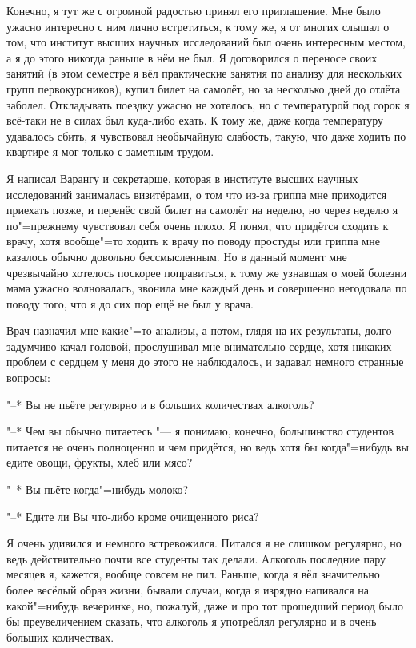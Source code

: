 Конечно, я тут же с огромной радостью принял его приглашение.
Мне было ужасно интересно с ним лично встретиться, к тому же, я от многих слышал
о том, что институт высших научных исследований был очень интересным местом, а
я до этого никогда раньше в нём не был.
Я договорился о переносе своих занятий (в этом семестре я вёл практические
занятия по анализу для нескольких групп первокурсников), купил билет на самолёт,
но за несколько дней до отлёта заболел.
Откладывать поездку ужасно не хотелось, но с температурой под сорок я всё-таки
не в силах был куда-либо ехать.
К тому же, даже когда температуру удавалось сбить, я чувствовал необычайную
слабость, такую, что даже ходить по квартире я мог только с заметным трудом.

Я написал Варангу и секретарше, которая в институте высших научных исследований
занималась визитёрами, о том что из-за гриппа мне приходится приехать позже, и
перенёс свой билет на самолёт на неделю, но через неделю я по"=прежнему
чувствовал себя очень плохо.
Я понял, что придётся сходить к врачу, хотя вообще"=то ходить к врачу по поводу
простуды или гриппа мне казалось обычно довольно бессмысленным.
Но в данный момент мне чрезвычайно хотелось поскорее поправиться, к тому же
узнавшая о моей болезни мама ужасно волновалась, звонила мне каждый день и
совершенно негодовала по поводу того, что я до сих пор ещё не был у врача.

Врач назначил мне какие"=то анализы, а потом, глядя на их результаты, долго
задумчиво качал головой, прослушивал мне внимательно сердце, хотя никаких
проблем с сердцем у меня до этого не наблюдалось, и задавал немного странные
вопросы:

"--* Вы не пьёте регулярно и в больших количествах алкоголь?

"--* Чем вы обычно питаетесь "--- я понимаю, конечно, большинство студентов питается
не очень полноценно и чем придётся, но ведь хотя бы когда"=нибудь вы едите овощи,
фрукты, хлеб или мясо?

"--* Вы пьёте когда"=нибудь молоко?

"--* Едите ли Вы что-либо кроме очищенного риса?

Я очень удивился и немного встревожился.
Питался я не слишком регулярно, но ведь действительно почти все студенты так
делали.
Алкоголь последние пару месяцев я, кажется, вообще совсем не пил.
Раньше, когда я вёл значительно более весёлый образ жизни, бывали случаи, когда
я изрядно напивался на какой"=нибудь вечеринке, но, пожалуй, даже и про тот
прошедший период было бы преувеличением сказать, что алкоголь я употреблял
регулярно и в очень больших количествах.

